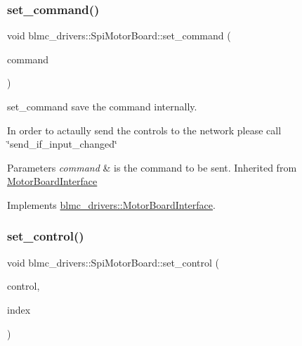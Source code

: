 \subsubsection{\texorpdfstring{set\+\_\+command()}{set\_command()}}
{\footnotesize\ttfamily void blmc\+\_\+drivers\+::\+Spi\+Motor\+Board\+::set\+\_\+command (\begin{DoxyParamCaption}\item[{const \hyperlink{classblmc__drivers_1_1MotorBoardCommand}{Motor\+Board\+Command} \&}]{command }\end{DoxyParamCaption})\hspace{0.3cm}{\ttfamily [virtual]}}



set\+\_\+command save the command internally. 

In order to actaully send the controls to the network please call \char`\"{}send\+\_\+if\+\_\+input\+\_\+changed\char`\"{}


\begin{DoxyParams}{Parameters}
{\em command} & is the command to be sent. Inherited from \hyperlink{classblmc__drivers_1_1MotorBoardInterface}{Motor\+Board\+Interface} \\
\hline
\end{DoxyParams}


Implements \hyperlink{classblmc__drivers_1_1MotorBoardInterface_a86b4ff810ca652d6761090ceaff65621}{blmc\+\_\+drivers\+::\+Motor\+Board\+Interface}.

\mbox{\label{classblmc__drivers_1_1SpiMotorBoard_ae11c5382665adfa718bcc43ec1e84b6e}} 
\subsubsection{\texorpdfstring{set\+\_\+control()}{set\_control()}}
{\footnotesize\ttfamily void blmc\+\_\+drivers\+::\+Spi\+Motor\+Board\+::set\+\_\+control (\begin{DoxyParamCaption}\item[{const double \&}]{control,  }\item[{const int \&}]{index }\end{DoxyParamCaption})\hspace{0.3cm}{\ttfamily [virtual]}}



